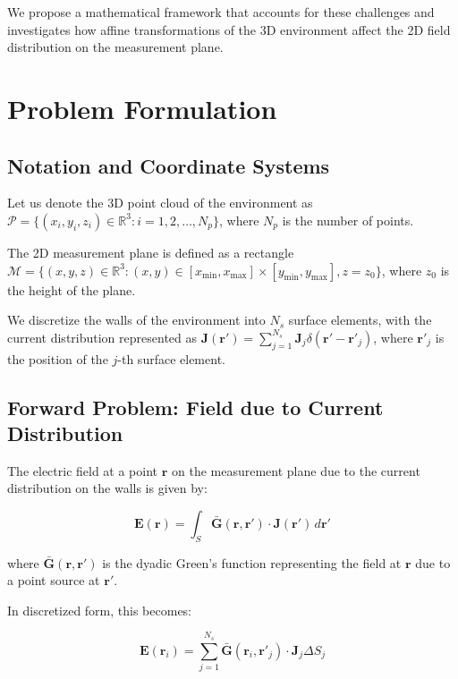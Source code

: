 \documentclass[12pt,a4paper]{article}
\begin{document}
We propose a mathematical framework that accounts for these challenges and investigates how affine transformations of the 3D environment affect the 2D field distribution on the measurement plane.

\section{Problem Formulation}

\subsection{Notation and Coordinate Systems}

Let us denote the 3D point cloud of the environment as $\mathcal{P} = \{(x_i, y_i, z_i) \in \mathbb{R}^3 : i = 1, 2, \ldots, N_p\}$, where $N_p$ is the number of points.

The 2D measurement plane is defined as a rectangle $\mathcal{M} = \{(x, y, z) \in \mathbb{R}^3 : (x, y) \in [x_{\min}, x_{\max}] \times [y_{\min}, y_{\max}], z = z_0\}$, where $z_0$ is the height of the plane.

We discretize the walls of the environment into $N_s$ surface elements, with the current distribution represented as $\mathbf{J}(\mathbf{r}') = \sum_{j=1}^{N_s} \mathbf{J}_j \delta(\mathbf{r}' - \mathbf{r}'_j)$, where $\mathbf{r}'_j$ is the position of the $j$-th surface element.

\subsection{Forward Problem: Field due to Current Distribution}

The electric field at a point $\mathbf{r}$ on the measurement plane due to the current distribution on the walls is given by:

\begin{equation}
    \mathbf{E}(\mathbf{r}) = \int_S \bar{\mathbf{G}}(\mathbf{r}, \mathbf{r}') \cdot \mathbf{J}(\mathbf{r}') \, d\mathbf{r}'
\end{equation}

where $\bar{\mathbf{G}}(\mathbf{r}, \mathbf{r}')$ is the dyadic Green's function representing the field at $\mathbf{r}$ due to a point source at $\mathbf{r}'$.

In discretized form, this becomes:

\begin{equation}
    \mathbf{E}(\mathbf{r}_i) = \sum_{j=1}^{N_s} \bar{\mathbf{G}}(\mathbf{r}_i, \mathbf{r}'_j) \cdot \mathbf{J}_j \Delta S_j
\end{equation}
\end{document}
